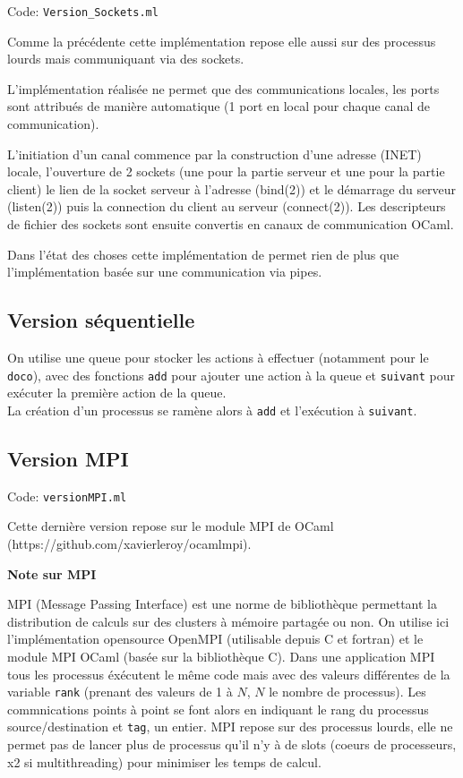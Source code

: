 \documentclass[a4paper]{article}
\begin{document}
Code: \verb|Version_Sockets.ml|

Comme la précédente cette implémentation repose elle aussi sur des processus lourds mais communiquant via des sockets.

L'implémentation réalisée ne permet que des communications locales, les ports sont attribués de manière automatique (1 port en local pour chaque canal de communication).

L'initiation d'un canal commence par la construction d'une adresse (INET) locale, l'ouverture de 2 sockets (une pour la partie serveur et une pour la partie client) le lien de la socket serveur à l'adresse (bind(2)) et le démarrage du serveur (listen(2)) puis la connection du client au serveur (connect(2)). Les descripteurs de fichier des sockets sont ensuite convertis en canaux de communication OCaml.

Dans l'état des choses cette implémentation de permet rien de plus que l'implémentation basée sur une communication via pipes.

\subsection{Version séquentielle}

On utilise une queue pour stocker les actions à effectuer (notamment pour le \texttt{doco}), avec des fonctions \texttt{add} pour ajouter une action à la queue et \texttt{suivant} pour exécuter la première action de la queue.\\
La création d'un processus se ramène alors à \texttt{add} et l'exécution à \texttt{suivant}.

\subsection{Version MPI}

Code: \verb|versionMPI.ml|

Cette dernière version repose sur le module MPI de OCaml (https://github.com/xavierleroy/ocamlmpi).

\textbf{Note sur MPI}

MPI (Message Passing Interface) est une norme de bibliothèque permettant la distribution de calculs sur des clusters à mémoire partagée ou non. On utilise ici l'implémentation opensource OpenMPI (utilisable depuis C et fortran) et le module MPI OCaml (basée sur la bibliothèque C). Dans une application MPI tous les processus éxécutent le même code mais avec des valeurs différentes de la variable \verb|rank| (prenant des valeurs de 1 à $N$, $N$ le nombre de processus). Les commnications points à point se font alors en indiquant le rang du processus source/destination et \verb|tag|, un entier. MPI repose sur des processus lourds, elle ne permet pas de lancer plus de processus qu'il n'y à de slots (coeurs de processeurs, x2 si multithreading) pour minimiser les temps de calcul.
\end{document}
